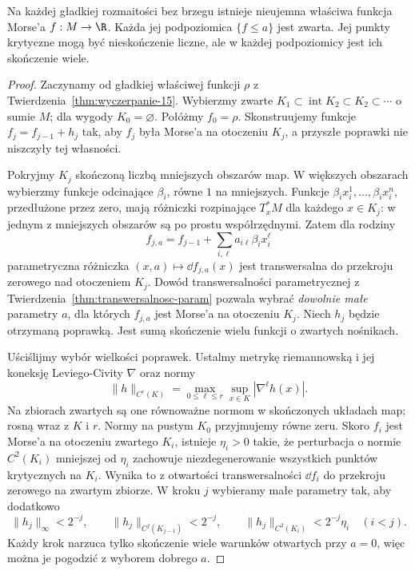 \begin{twierdzenie}
\label{thm:wlasciwa-morse-15}
Na każdej gładkiej rozmaitości bez brzegu
istnieje nieujemna właściwa funkcja Morse'a $f:M\to\R$.
Każda jej podpoziomica $\{f\leq a\}$ jest zwarta.
Jej punkty krytyczne mogą być nieskończenie liczne,
ale w każdej podpoziomicy jest ich skończenie wiele.
\end{twierdzenie}
\begin{proof}
Zaczynamy od gładkiej właściwej
funkcji $\rho$ z
Twierdzenia~\ref{thm:wyczerpanie-15}.
Wybierzmy zwarte
$K_1\subset\operatorname{int}K_2
\subset K_2\subset\cdots$
o sumie $M$; dla wygody
$K_0=\varnothing$. Połóżmy $f_0=\rho$.
Skonstruujemy funkcje
$f_j=f_{j-1}+h_j$ tak, aby $f_j$
była Morse'a na otoczeniu $K_j$,
a przyszłe poprawki nie niszczyły
tej własności.

Pokryjmy $K_j$ skończoną liczbą
mniejszych obszarów map. W większych
obszarach wybierzmy funkcje
odcinające $\beta_i$, równe $1$
na mniejszych. Funkcje
$\beta_i x_i^1,\ldots,\beta_i x_i^n$,
przedłużone przez zero, mają
różniczki rozpinające $T_x^*M$
dla każdego $x\in K_j$:
w jednym z mniejszych obszarów
są po prostu współrzędnymi.
Zatem dla rodziny
\[
 f_{j,a}=f_{j-1}
       +\sum_{i,\ell}a_{i\ell}\beta_i x_i^\ell
\]
parametryczna różniczka
$(x,a)\mapsto\dd f_{j,a}(x)$
jest transwersalna do przekroju
zerowego nad otoczeniem $K_j$.
Dowód transwersalności
parametrycznej z
Twierdzenia~\ref{thm:transwersalnosc-param}
pozwala wybrać \emph{dowolnie
małe} parametry $a$, dla których
$f_{j,a}$ jest Morse'a na
otoczeniu $K_j$. Niech $h_j$
będzie otrzymaną poprawką.
Jest sumą skończenie wielu
funkcji o zwartych nośnikach.

Uściślijmy wybór wielkości poprawek. Ustalmy
metrykę riemannowską i jej koneksję Leviego-Civity $\nabla$ oraz normy
\[
 \|h\|_{C^r(K)}=\max_{0\leq\ell\leq r}
       \sup_{x\in K}|\nabla^\ell h(x)|.
\]
Na zbiorach zwartych są one równoważne normom
w skończonych układach map; rosną wraz z $K$ i $r$.
Normy na pustym $K_0$ przyjmujemy równe zeru.
Skoro $f_i$ jest Morse'a na
otoczeniu zwartego $K_i$,
istnieje $\eta_i>0$ takie,
że perturbacja o normie
$C^2(K_i)$ mniejszej od
$\eta_i$ zachowuje
niezdegenerowanie wszystkich
punktów krytycznych na $K_i$.
Wynika to z otwartości
transwersalności $\dd f_i$
do przekroju zerowego
na zwartym zbiorze.
W kroku $j$ wybieramy małe
parametry tak, aby dodatkowo
\[
 \|h_j\|_\infty<2^{-j},\qquad
 \|h_j\|_{C^j(K_{j-1})}<2^{-j},\qquad
 \|h_j\|_{C^2(K_i)}
          <2^{-j}\eta_i\quad(i<j).
\]
Każdy krok narzuca tylko
skończenie wiele warunków
otwartych przy $a=0$,
więc można je pogodzić
z wyborem dobrego $a$.


\end{proof}

